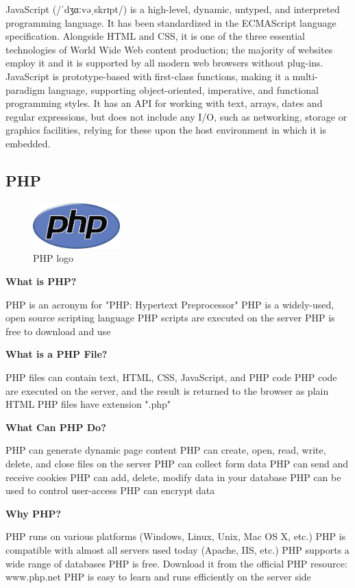 JavaScript (/ˈdʒɑːvəˌskrɪpt/) is a high-level, dynamic, untyped, and interpreted programming language. It has been standardized in the ECMAScript language specification. Alongside HTML and CSS, it is one of the three essential technologies of World Wide Web content production; the majority of websites employ it and it is supported by all modern web browsers without plug-ins. JavaScript is prototype-based with first-class functions, making it a multi-paradigm language, supporting object-oriented, imperative, and functional programming styles. It has an API for working with text, arrays, dates and regular expressions, but does not include any I/O, such as networking, storage or graphics facilities, relying for these upon the host environment in which it is embedded.
\subsection{PHP}
\begin{figure}[!ht]
\centering
\includegraphics[width=0.3\textwidth]{input/images/php.png}
\caption{PHP logo}
\hspace{-1.5em}
\end{figure}
 {\bf What is PHP?}

    PHP is an acronym for "PHP: Hypertext Preprocessor"
    PHP is a widely-used, open source scripting language
    PHP scripts are executed on the server
    PHP is free to download and use

 {\bf What is a PHP File?}

    PHP files can contain text, HTML, CSS, JavaScript, and PHP code
    PHP code are executed on the server, and the result is returned to the browser as plain HTML
    PHP files have extension ".php"

 {\bf What Can PHP Do?}

    PHP can generate dynamic page content
    PHP can create, open, read, write, delete, and close files on the server
    PHP can collect form data
    PHP can send and receive cookies
    PHP can add, delete, modify data in your database
    PHP can be used to control user-access
    PHP can encrypt data

  {\bf Why PHP?}

    PHP runs on various platforms (Windows, Linux, Unix, Mac OS X, etc.)
    PHP is compatible with almost all servers used today (Apache, IIS, etc.)
    PHP supports a wide range of databases
    PHP is free. Download it from the official PHP resource: www.php.net
    PHP is easy to learn and runs efficiently on the server side
